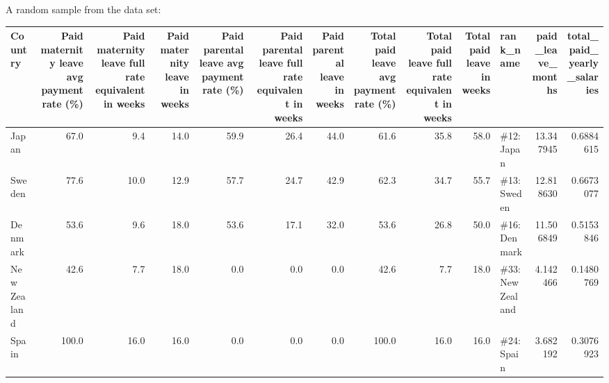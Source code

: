 \documentclass[]{book}
\theoremstyle{definition}
\theoremstyle{definition}
\theoremstyle{definition}
\theoremstyle{remark}
\begin{document}
A random sample from the data set:

\begin{tabular}{l|r|r|r|r|r|r|r|r|r|l|r|r}
\hline
Country & Paid maternity leave avg payment rate (\%) & Paid maternity leave full rate equivalent in weeks & Paid maternity leave in weeks & Paid parental leave avg payment rate (\%) & Paid parental leave full rate equivalent in weeks & Paid parental leave in weeks & Total paid leave avg payment rate (\%) & Total paid leave full rate equivalent in weeks & Total paid leave in weeks & rank\_name & paid\_leave\_months & total\_paid\_yearly\_salaries\\
\hline
Japan & 67.0 & 9.4 & 14.0 & 59.9 & 26.4 & 44.0 & 61.6 & 35.8 & 58.0 & \#12: Japan & 13.347945 & 0.6884615\\
\hline
Sweden & 77.6 & 10.0 & 12.9 & 57.7 & 24.7 & 42.9 & 62.3 & 34.7 & 55.7 & \#13: Sweden & 12.818630 & 0.6673077\\
\hline
Denmark & 53.6 & 9.6 & 18.0 & 53.6 & 17.1 & 32.0 & 53.6 & 26.8 & 50.0 & \#16: Denmark & 11.506849 & 0.5153846\\
\hline
New Zealand & 42.6 & 7.7 & 18.0 & 0.0 & 0.0 & 0.0 & 42.6 & 7.7 & 18.0 & \#33: New Zealand & 4.142466 & 0.1480769\\
\hline
Spain & 100.0 & 16.0 & 16.0 & 0.0 & 0.0 & 0.0 & 100.0 & 16.0 & 16.0 & \#24: Spain & 3.682192 & 0.3076923\\
\hline
\end{tabular}
\end{document}
